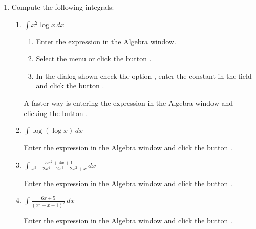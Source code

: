 \begin{enumerate}[leftmargin=*]
\item Compute the following integrals:
\begin{enumerate}
\item $ \int{x^2 \log x\,dx}$
\begin{indication}
\begin{enumerate}
\item Enter the expression  in the Algebra window.
\item Select the menu  or click the button .
\item In the dialog shown check the option , enter the constant  in the field  and click the button .
\end{enumerate}
A faster way is entering the expression  in the Algebra window and clicking the button .
\end{indication}

\item $\int \log(\log x)\,dx$
\begin{indication}
Enter the expression  in the Algebra window and click the button .
\end{indication}

\item $\displaystyle \int \frac{5x^{2}+4x+1}{x^{5}-2x^{4}+2x^{3}-2x^{2}+x}\,dx$
\begin{indication}
Enter the expression  in the Algebra window and click the button .
\end{indication}

\item $\displaystyle \int \frac{6x+5}{(x^{2}+x+1)^{2}}\,dx$
\begin{indication}
Enter the expression  in the Algebra window and click the button .
\end{indication}
\end{enumerate}



\end{enumerate}
